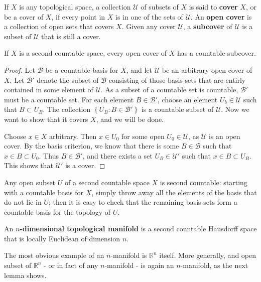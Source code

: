 \documentclass{mathnotes}
\begin{document}
\begin{defn}
    If $X$ is any topological space, a collection $\mathcal{U}$ of subsets of $X$ is said to \textbf{cover} $X$, or be a cover of $X$, if every point
    in $X$ is in one of the sets of $\mathcal{U}$. An \textbf{open cover} is a collection of open sets that covers $X$. Given any cover $\mathcal{U}$, a
    \textbf{subcover} of $\mathcal{U}$ is a subset of $\mathcal{U}$ that is still a cover.
\end{defn}

\begin{lem}
    If $X$ is a second countable space, every open cover of $X$ has a countable subcover.
\end{lem}

\begin{proof}
    Let $\mathcal{B}$ be a countable basis for $X$, and let $\mathcal{U}$ be an arbitrary open cover of $X$. Let $\mathcal{B}'$ denote the subset
    of $\mathcal{B}$ consisting of those basis sets that are entirly contained in some element of $\mathcal{U}$. As a subset of a countable set
    is countable, $\mathcal{B}'$ must be a countable set. For each element $B\in \mathcal{B}'$, choose an element $U_b\in \mathcal{U}$ such that
    $B\subset U_B$. The collection $\left\{ U_B:B\in\mathcal{B}' \right\}$ is a countable subset of $\mathcal{U}$. Now we want to show that it
    covers $X$, and we will be done.

    Choose $x\in X$ arbitrary. Then $x\in U_0$ for some open $U_0\in\mathcal{U}$, as $\mathcal{U}$ is an open cover. By the basis criterion, we
    know that there is some $B\in\mathcal{B}$ such that $x\in B\subset U_0$. Thus $B\in\mathcal{B}'$, and there exists a set $U_B\in\mathcal{U}'$
    such that $x\in B\subset U_B$. This shows that $\mathcal{U}'$ is a cover.
\end{proof}

Any open subset $U$ of a second countable space $X$ is second countable: starting with a countable basis for $X$, simply throw away all the
elements of the basis that do not lie in $U$; then it is easy to check that the remaining basis sets form a countable basis for the topology
of $U$.

\begin{defn}
    An \textbf{$n$-dimensional topological manifold} is a second countable Hausdorff space that is locally Euclidean of dimension $n$.
\end{defn}

The most obvious example of an $n$-manifold is $\mathbb{R}^n$ itself. More generally, and open subset of $\mathbb{R}^n$ - or in fact of
any $n$-manifold - is again an $n$-manifold, as the next lemma shows.
\end{document}

